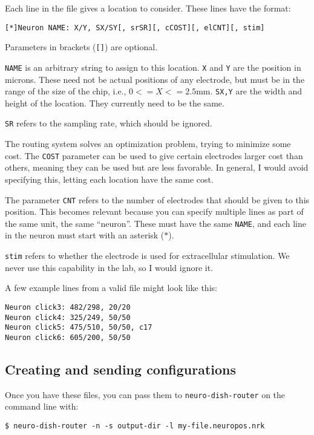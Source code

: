 \documentclass[12pt]{article}
\begin{document}
Each line in the file gives a location to consider. These lines have the format:

\begin{verbatim}
[*]Neuron NAME: X/Y, SX/SY[, srSR][, cCOST][, elCNT][, stim]
\end{verbatim}

Parameters in brackets (\texttt{[]}) are optional.

\texttt{NAME} is an arbitrary string to assign to this location. \texttt{X} and
\texttt{Y} are the position in microns. These need not be actual positions of
any electrode, but must be in the range of the size of the chip, i.e., 
$0 <= X <= 2.5$mm. \texttt{S{X,Y}} are the width and height of the location.
They currently need to be the same.

\texttt{SR} refers to the sampling rate, which should be ignored.

The routing system solves an optimization problem, trying to minimize
some cost. The \texttt{COST} parameter can be used to give certain electrodes
larger cost than others, meaning they can be used but are less favorable. In 
general, I would avoid specifying this, letting each location have the same
cost.

The parameter \texttt{CNT} refers to the number of electrodes that should be given
to this position. This becomes relevant because you can specify multiple lines
as part of the same unit, the same ``neuron''. These must have the same
\texttt{NAME}, and each line in the neuron must start with an asterisk ($\ast$).

\texttt{stim} refers to whether the electrode is used for extracellular
stimulation. We never use this capability in the lab, so I would ignore it.

A few example lines from a valid file might look like this:

\begin{verbatim}
Neuron click3: 482/298, 20/20
Neuron click4: 325/249, 50/50
Neuron click5: 475/510, 50/50, c17
Neuron click6: 605/200, 50/50
\end{verbatim}

\subsection*{Creating and sending configurations}

Once you have these files, you can pass them to \texttt{neuro-dish-router} 
on the command line with:

\begin{verbatim}
$ neuro-dish-router -n -s output-dir -l my-file.neuropos.nrk
\end{verbatim}
\end{document}
